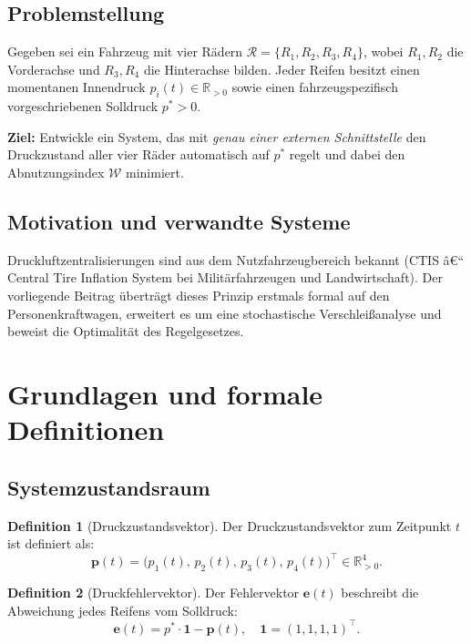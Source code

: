 ﻿\documentclass[a4paper,12pt]{article}
\theoremstyle{definition}
\newtheorem{definition}{Definition}
\begin{document}
\subsection{Problemstellung}

Gegeben sei ein Fahrzeug mit vier Rädern
$\mathcal{R} = \{R_1, R_2, R_3, R_4\}$, wobei $R_1, R_2$ die Vorderachse und
$R_3, R_4$ die Hinterachse bilden. Jeder Reifen besitzt einen momentanen
Innendruck $p_i(t) \in \mathbb{R}_{>0}$ sowie einen fahrzeugspezifisch
vorgeschriebenen Solldruck $p^* > 0$.

\textbf{Ziel:} Entwickle ein System, das mit \emph{genau einer externen
Schnittstelle} den Druckzustand aller vier Räder automatisch auf $p^*$
regelt und dabei den Abnutzungsindex $\mathcal{W}$ minimiert.

\subsection{Motivation und verwandte Systeme}

Druckluftzentralisierungen sind aus dem Nutzfahrzeugbereich bekannt
(CTIS â€“ Central Tire Inflation System bei Militärfahrzeugen und Landwirtschaft).
Der vorliegende Beitrag überträgt dieses Prinzip erstmals formal auf den
Personenkraftwagen, erweitert es um eine stochastische Verschleißanalyse
und beweist die Optimalität des Regelgesetzes.

\section{Grundlagen und formale Definitionen}

\subsection{Systemzustandsraum}

\begin{definition}[Druckzustandsvektor]
Der Druckzustandsvektor zum Zeitpunkt $t$ ist definiert als:
\[
    \mathbf{p}(t) = \bigl(p_1(t),\, p_2(t),\, p_3(t),\, p_4(t)\bigr)^{\top}
    \in \mathbb{R}_{>0}^4.
\]
\end{definition}

\begin{definition}[Druckfehlervektor]
Der Fehlervektor $\mathbf{e}(t)$ beschreibt die Abweichung jedes Reifens vom
Solldruck:
\[
    \mathbf{e}(t) = p^* \cdot \mathbf{1} - \mathbf{p}(t),
    \quad \mathbf{1} = (1,1,1,1)^{\top}.
\]
\end{definition}
\end{document}
